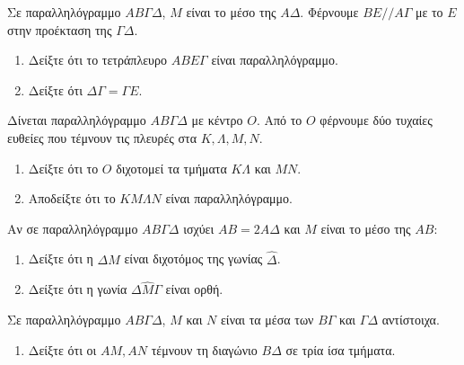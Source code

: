 \documentclass[11pt,a4paper,modern]{FFExercises}
\begin{document}
\askhsh Σε παραλληλόγραμμο $ΑΒ\varGamma\Delta$, $Μ$ είναι το μέσο της $Α\Delta$. Φέρνουμε $ΒΕ // Α\varGamma$ με το $Ε$ στην προέκταση της $\varGamma\Delta$.
\begin{enumerate}[label=\roman*)]
    \item Δείξτε ότι το τετράπλευρο $ΑΒΕ\varGamma$ είναι παραλληλόγραμμο.
    \item Δείξτε ότι $\Delta\varGamma = \varGamma Ε$.
\end{enumerate}

\askhsh Δίνεται παραλληλόγραμμο $ΑΒ\varGamma\Delta$ με κέντρο $Ο$. Από το $Ο$ φέρνουμε δύο τυχαίες ευθείες που τέμνουν τις πλευρές στα $Κ, \Lambda, Μ, Ν$.
\begin{enumerate}[label=\roman*)]
    \item Δείξτε ότι το $Ο$ διχοτομεί τα τμήματα $Κ\Lambda$ και $ΜΝ$.
    \item Αποδείξτε ότι το $ΚΜ\Lambda Ν$ είναι παραλληλόγραμμο.
\end{enumerate}

\askhsh Αν σε παραλληλόγραμμο $ΑΒ\varGamma\Delta$ ισχύει $ΑΒ = 2Α\Delta$ και $Μ$ είναι το μέσο της $ΑΒ$:
\begin{enumerate}[label=\roman*)]
    \item Δείξτε ότι η $\Delta Μ$ είναι διχοτόμος της γωνίας $\hat{\Delta}$.
    \item Δείξτε ότι η γωνία $\Delta\hat{Μ}\varGamma$ είναι ορθή.
\end{enumerate}

\askhsh Σε παραλληλόγραμμο $ΑΒ\varGamma\Delta$, $Μ$ και $Ν$ είναι τα μέσα των $Β\varGamma$ και $\varGamma\Delta$ αντίστοιχα.
\begin{enumerate}[label=\roman*)]
    \item Δείξτε ότι οι $ΑΜ, ΑΝ$ τέμνουν τη διαγώνιο $Β\Delta$ σε τρία ίσα τμήματα.
\end{enumerate}
\end{document}
